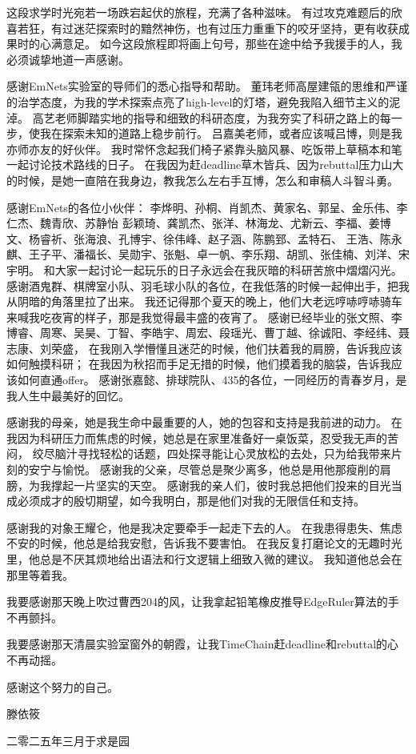 \cleardoublepage
{}
这段求学时光宛若一场跌宕起伏的旅程，充满了各种滋味。
有过攻克难题后的欣喜若狂，有过迷茫探索时的黯然神伤，也有过压力重重下的咬牙坚持，更有收获成果时的心满意足。
如今这段旅程即将画上句号，那些在途中给予我援手的人，我必须诚挚地道一声感谢。

感谢EmNets实验室的导师们的悉心指导和帮助。
董玮老师高屋建瓴的思维和严谨的治学态度，为我的学术探索点亮了high-level的灯塔，避免我陷入细节主义的泥淖。
高艺老师脚踏实地的指导和细致的科研态度，为我夯实了科研之路上的每一步，使我在探索未知的道路上稳步前行。
吕嘉美老师，或者应该喊吕博，则是我亦师亦友的好伙伴。
我时常怀念起我们椅子紧靠头脑风暴、吃饭带上草稿本和笔一起讨论技术路线的日子。
在我因为赶deadline草木皆兵、因为rebuttal压力山大的时候，是她一直陪在我身边，教我怎么左右手互博，怎么和审稿人斗智斗勇。

感谢EmNets的各位小伙伴：
李烨明、孙桐、肖凯杰、黄家名、郭呈、金乐伟、李仁杰、魏青欣、苏静怡
彭颖琦、龚凯杰、张洋、林海龙、尤新云、李福、姜博文、杨睿祈、张海浪、孔博宇、徐伟峰、赵子涵、陈鹏郅、孟特石、
王浩、陈永麒、王子平、潘福长、吴勋宇、张魁、卓一帆、李乐翔、胡凯、张佳楠、刘洋、宋宇明。
和大家一起讨论一起玩乐的日子永远会在我灰暗的科研苦旅中熠熠闪光。
感谢酒鬼群、棋牌室小队、羽毛球小队的各位，在我低落的时候一起伸出手，把我从阴暗的角落里拉了出来。
我还记得那个夏天的晚上，他们大老远哼哧哼哧骑车来喊我吃夜宵的样子，那是我觉得最丰盛的夜宵了。
感谢已经毕业的张文照、李博睿、周寒、吴昊、丁智、李皓宇、周宏、段瑶光、曹丁越、徐诚阳、李经纬、聂志康、刘荣盛，
在我刚入学懵懂且迷茫的时候，他们扶着我的肩膀，告诉我应该如何触摸科研；
在我因为秋招而手足无措的时候，他们摸着我的脑袋，告诉我应该如何直通offer。
感谢张嘉懿、排球院队、435的各位，一同经历的青春岁月，是我人生中最美好的回忆。

感谢我的母亲，她是我生命中最重要的人，她的包容和支持是我前进的动力。
在我因为科研压力而焦虑的时候，她总是在家里准备好一桌饭菜，忍受我无声的苦闷，
绞尽脑汁寻找轻松的话题，四处探寻能让心灵放松的去处，只为给我带来片刻的安宁与愉悦。
感谢我的父亲，尽管总是聚少离多，他总是用他那瘦削的肩膀，为我撑起一片坚实的天空。
感谢我的亲人们，彼时我总把他们投来的目光当成必须成才的殷切期望，如今我明白，那是他们对我的无限信任和支持。

感谢我的对象王耀仑，他是我决定要牵手一起走下去的人。
在我患得患失、焦虑不安的时候，他总是给我安慰，告诉我不要害怕。
在我反复打磨论文的无趣时光里，他总是不厌其烦地给出语法和行文逻辑上细致入微的建议。
我知道他总会在那里等着我。

我要感谢那天晚上吹过曹西204的风，让我拿起铅笔橡皮推导EdgeRuler算法的手不再颤抖。

我要感谢那天清晨实验室窗外的朝霞，让我TimeChain赶deadline和rebuttal的心不再动摇。

感谢这个努力的自己。

\vspace{\baselineskip}

\noindent\hfill 滕依筱

\noindent\hfill 二零二五年三月于求是园 \\
